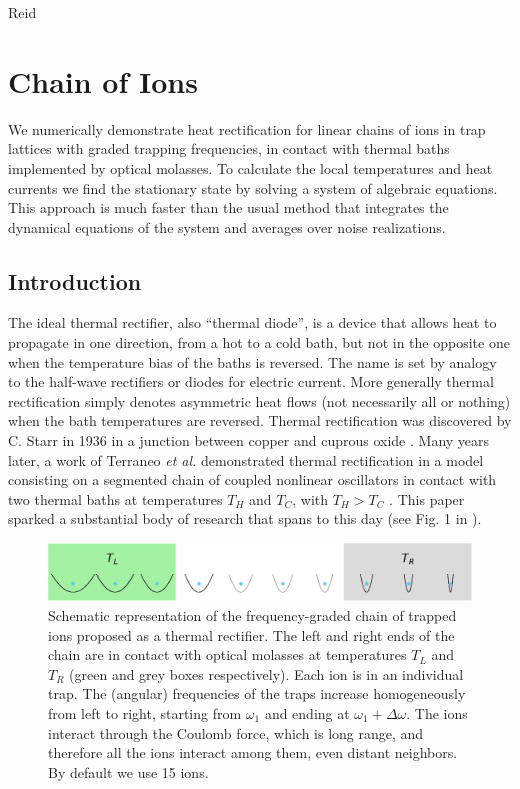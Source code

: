 Reid%

\chapter{Chain of Ions}
\label{RectificationChainOfIons}
%
We numerically demonstrate heat rectification for linear chains of  ions in trap lattices with  graded  trapping frequencies, in contact with
thermal baths implemented by optical molasses.  To calculate the local temperatures and heat currents we find the stationary state
by solving a system of algebraic equations. This approach is much faster than the usual method
that integrates the dynamical equations of the system and averages over noise realizations.
%
\newpage
%
\section{Introduction\label{IntroductionRectificationChainOfIons}}

The ideal thermal rectifier, also ``thermal diode'',  is a device that allows heat to propagate in one direction, from a hot to a cold bath, but not in the opposite one when the temperature bias of the baths is  reversed. The name is set by analogy to the
half-wave rectifiers or diodes for electric current. More generally thermal rectification simply denotes
asymmetric heat flows (not necessarily all or nothing) when the bath temperatures are reversed.
 Thermal rectification was discovered by C. Starr in 1936 in a junction between copper and cuprous oxide \cite{Starr1936}. Many years later, a work of Terraneo \textit{et al.} demonstrated thermal rectification in a model
consisting on a segmented chain of coupled nonlinear oscillators  in contact with two thermal baths at temperatures $T_H$ and $T_C$, with $T_H > T_C$ \cite{Terraneo2002}. This paper sparked a substantial body of research  that spans to this day \cite{Pereira2019} (see Fig. 1 in \cite{Roberts2011}).

\begin{figure}
    \centering
    \includegraphics[width=0.9\linewidth]{Figures/Diagram.eps}
    \caption{Schematic representation  of the frequency-graded chain of trapped ions proposed as a thermal rectifier. The left and right ends of the chain are in contact with optical molasses at temperatures $T_L$ and $T_R$ (green and grey boxes respectively). Each ion is in an individual trap. The (angular) frequencies of the traps increase homogeneously from left to right, starting from $\omega_1$ and ending at $\omega_1+\Delta\omega$. The ions interact through the Coulomb force, which is long range, and therefore all the ions interact among them, even distant neighbors. By default  we use 15 ions.}
    \label{fig:Diagram}
\end{figure}

